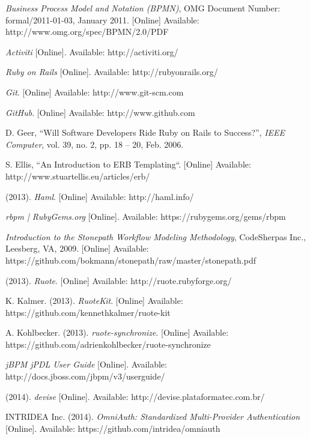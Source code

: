 \renewcommand{\bibname}{References}
\begin{thebibliography}{99}

\raggedright

\textit{Business Process Model and Notation
(BPMN)}, OMG Document Number: formal/2011-01-03, January 2011. [Online] Available: http://www.omg.org/spec/BPMN/2.0/PDF

\textit{Activiti} [Online]. Available: http://activiti.org/

\textit{Ruby on Rails} [Online]. Available: http://rubyonrails.org/

\textit{Git}. [Online] Available: http://www.git-scm.com

\textit{GitHub}. [Online] Available: http://www.github.com

D. Geer, ``Will Software Developers Ride Ruby on Rails to Success?'', \textit{IEEE Computer}, vol. 39, no. 2, pp. 18 -- 20, Feb. 2006.

S. Ellis, ``An Introduction to ERB Templating``. [Online] Available: http://www.stuartellis.eu/articles/erb/

(2013). \textit{Haml}. [Online] Available: http://haml.info/

\textit{rbpm | RubyGems.org} [Online]. Available: https://rubygems.org/gems/rbpm

\textit{Introduction to the Stonepath Workflow Modeling Methodology},
CodeSherpas Inc., Leesberg, VA, 2009. [Online] Available: https://github.com/bokmann/stonepath/raw/master/stonepath.pdf

(2013). \textit{Ruote}. [Online] Available: http://ruote.rubyforge.org/

K. Kalmer. (2013). \textit{RuoteKit}. [Online] Available: https://github.com/kennethkalmer/ruote-kit

A. Kohlbecker. (2013). \textit{ruote-synchronize}. [Online] Available: https://github.com/adrienkohlbecker/ruote-synchronize

\textit{jBPM jPDL User Guide} [Online]. Available: http://docs.jboss.com/jbpm/v3/userguide/

(2014). \textit{devise} [Online]. Available: http://devise.plataformatec.com.br/

INTRIDEA Inc. (2014). \textit{OmniAuth: Standardized Multi-Provider Authentication} [Online]. Available: https://github.com/intridea/omniauth


\end{thebibliography}
